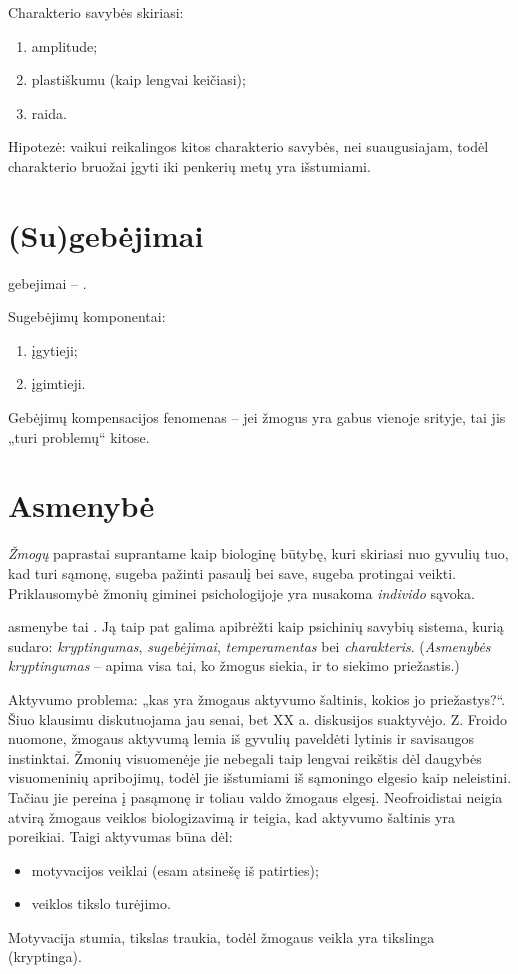 Charakterio savybės skiriasi:

\begin{enumerate}
  \item amplitude;
  \item plastiškumu (kaip lengvai keičiasi);
  \item raida.
\end{enumerate}

Hipotezė: vaikui reikalingos kitos charakterio savybės, nei suaugusiajam,
todėl charakterio bruožai įgyti iki penkerių metų yra išstumiami.

\section{(Su)gebėjimai}

\Gls{gebejimai} – .

Sugebėjimų komponentai:

\begin{enumerate}
  \item įgytieji;
  \item įgimtieji.
\end{enumerate}

Gebėjimų kompensacijos fenomenas – jei žmogus yra gabus vienoje srityje, 
tai jis „turi problemų“ kitose.

\section{Asmenybė}

\label{tema:asmenybe}

\emph{Žmogų} paprastai suprantame kaip biologinę būtybę, kuri skiriasi nuo
gyvulių tuo, kad turi sąmonę, sugeba pažinti pasaulį bei save, sugeba 
protingai veikti. Priklausomybė žmonių giminei psichologijoje yra
nusakoma \emph{individo} sąvoka.

\Gls{asmenybe} tai . Ją taip pat galima apibrėžti 
kaip psichinių savybių sistema, kurią sudaro: \emph{kryptingumas}, 
\emph{sugebėjimai}, \emph{temperamentas} bei \emph{charakteris}.
(\emph{Asmenybės kryptingumas} – apima visa tai, ko žmogus siekia, ir to 
siekimo priežastis.)

Aktyvumo problema: „kas yra žmogaus aktyvumo šaltinis, kokios jo 
priežastys?“. Šiuo klausimu diskutuojama jau senai, bet XX a. diskusijos 
suaktyvėjo. Z. Froido nuomone, žmogaus aktyvumą lemia iš gyvulių paveldėti 
lytinis ir savisaugos instinktai. Žmonių visuomenėje jie nebegali taip 
lengvai reikštis dėl daugybės visuomeninių apribojimų, todėl jie išstumiami 
iš sąmoningo elgesio kaip neleistini. Tačiau jie pereina į pasąmonę ir 
toliau valdo žmogaus elgesį. Neofroidistai neigia atvirą žmogaus veiklos 
biologizavimą ir teigia, kad aktyvumo šaltinis yra poreikiai.
Taigi aktyvumas būna dėl:
\begin{itemize}
  \item motyvacijos veiklai (esam atsinešę iš patirties);
  \item veiklos tikslo turėjimo.
\end{itemize}
Motyvacija stumia, tikslas traukia, todėl žmogaus veikla yra tikslinga
(kryptinga).

